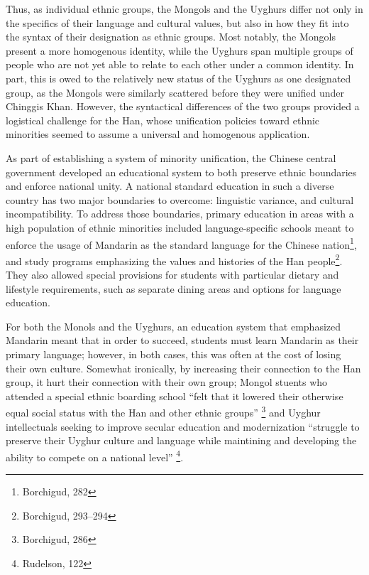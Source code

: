 Thus, as individual ethnic groups, the Mongols and the Uyghurs differ not only
in the specifics of their language and cultural values, but also in how they
fit into the syntax of their designation as ethnic groups. Most notably, the
Mongols present a more homogenous identity, while the Uyghurs span multiple
groups of people who are not yet able to relate to each other under a common
identity. In part, this is owed to the relatively new status of the Uyghurs as
one designated group, as the Mongols were similarly scattered before they were
unified under Chinggis Khan. However, the syntactical differences of the two
groups provided a logistical challenge for the Han, whose unification policies
toward ethnic minorities seemed to assume a universal and homogenous
application.
 
\hrulefill

As part of establishing a system of minority unification, the Chinese
central government developed an educational system to both preserve ethnic
boundaries and enforce national unity. A national standard education in such a
diverse country has two major boundaries to overcome: linguistic variance, and
cultural incompatibility. To address those boundaries, primary education in
areas with a high population of ethnic minorities included language-specific
schools meant to enforce the usage of Mandarin as the standard language for
the Chinese nation\footnote{Borchigud, 282}, and study programs emphasizing the
values and histories of the Han people\footnote{Borchigud, 293--294}. They also allowed special provisions for students with particular dietary and lifestyle requirements, such as separate dining areas and options for language education.

For both the Monols and the Uyghurs, an education system that emphasized
Mandarin meant that in order to succeed, students must learn Mandarin as their
primary language; however, in both cases, this was often at the cost of losing
their own culture. Somewhat ironically, by increasing their connection to the
Han group, it hurt their connection with their own group; Mongol stuents who
attended a special ethnic boarding school ``felt that it lowered their
otherwise equal social status with the Han and other ethnic groups''
\footnote{Borchigud, 286} and Uyghur intellectuals seeking to improve secular
education and modernization ``struggle to preserve their Uyghur culture and
language while maintining and developing the ability to compete on a national
level'' \footnote{Rudelson, 122}.

